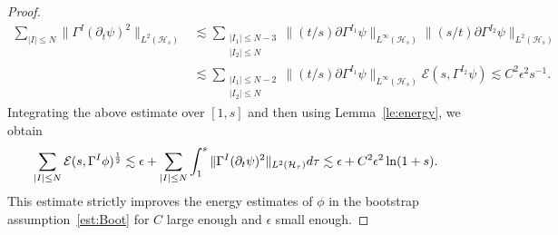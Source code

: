 \documentclass[10pt,a4paper]{amsart}
\def \d {{\rm{d}}}
\def \pt{\partial_{t}}
\begin{document}
\begin{proof}
\begin{equation*}
\begin{aligned}
    \sum_{|I|\le N}\|\Gamma^{I}(\pt \psi)^{2}\|_{L^{2}(\mathcal{H}_{s})}
    &\lesssim \sum_{\substack{|I_{1}|\le N-3\\ |I_{2}|\le N}}
    \|(t/s)\partial\Gamma^{I_{1}}\psi\|_{L^{\infty}(\mathcal{H}_{s})}\|(s/t)\partial\Gamma^{I_{2}}\psi\|_{L^{2}(\mathcal{H}_{s})}\\
    &\lesssim \sum_{\substack{|I_{1}|\le N-2\\ |I_{2}|\le N}}
    \|(t/s)\partial\Gamma^{I_{1}}\psi\|_{L^{\infty}(\mathcal{H}_{s})}\mathcal{E}(s,\Gamma^{I_{2}}\psi)\lesssim C^{2}\epsilon^{2}s^{-1}.
    \end{aligned}
\end{equation*}
Integrating the above estimate over $[1,s]$ and then using Lemma~\ref{le:energy}, we obtain
\begin{equation*}
    \sum_{|I|\le N}\mathcal{E}(s,\Gamma^{I}\phi)^{\frac{1}{2}}
    \lesssim  \epsilon
    +\sum_{|I|\le N}\int_{1}^{s}\|\Gamma^{I}(\pt \psi)^{2}\|_{L^{2}(\mathcal{H}_{\tau})}\d \tau
    \lesssim
    \epsilon+C^{2}\epsilon^{2}\ln (1+s).
\end{equation*}
This estimate strictly improves the energy estimates of $\phi$ in the bootstrap assumption~\eqref{est:Boot} for $C$ large enough and $\epsilon$ small enough.


\end{proof}
\end{document}

